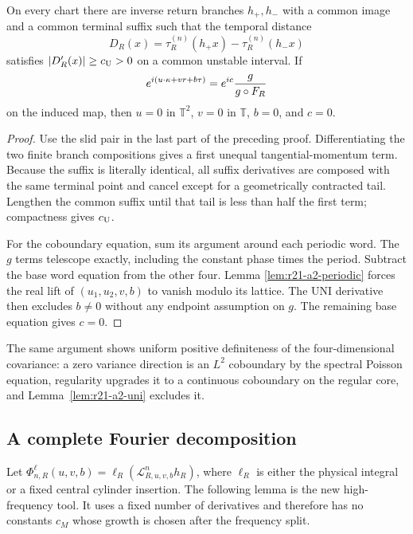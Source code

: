 \begin{lemma}
\label{lem:r21-a2-uni}
On every chart there are inverse return branches $h_+,h_-$ with a common
image and a common terminal suffix such that the temporal distance
\[
 D_R(x)=\tau_R^{(n)}(h_+x)-\tau_R^{(n)}(h_-x)
\]
satisfies $|D_R'(x)|\ge c_{\rm U}>0$ on a common unstable interval.  If
\[
 e^{i(u\cdot\kappa+vr+b\tau)}
 =e^{ic}{g\over g\circ F_R}
\]
on the induced map, then $u=0$ in $\mathbb T^2$, $v=0$ in $\mathbb T$,
$b=0$, and $c=0$.
\end{lemma}

\begin{proof}
Use the slid pair in the last part of the preceding proof.  Differentiating
the two finite branch compositions gives a first unequal tangential-momentum
term.  Because the suffix is literally identical, all suffix derivatives are
composed with the same terminal point and cancel except for a geometrically
contracted tail.  Lengthen the common suffix until that tail is less than half
the first term; compactness gives $c_{\rm U}$.

For the coboundary equation, sum its argument around each periodic word.  The
$g$ terms telescope exactly, including the constant phase times the period.
Subtract the base word equation from the other four.  Lemma
\ref{lem:r21-a2-periodic} forces the real lift of $(u_1,u_2,v,b)$ to vanish
modulo its lattice.  The UNI derivative then excludes $b\ne0$ without any
endpoint assumption on $g$.  The remaining base equation gives $c=0$.
\end{proof}

The same argument shows uniform positive definiteness of the four-dimensional
covariance: a zero variance direction is an $L^2$ coboundary by the spectral
Poisson equation, regularity upgrades it to a continuous coboundary on the
regular core, and Lemma~\ref{lem:r21-a2-uni} excludes it.

\subsection{A complete Fourier decomposition}

Let $\Phi_{n,R}^{\ell}(u,v,b)=
\ell_R(\mathcal L_{R,u,v,b}^nh_R)$, where $\ell_R$ is either the physical
integral or a fixed central cylinder insertion.  The following lemma is the
new high-frequency tool.  It uses a fixed number of derivatives and therefore
has no constants $c_M$ whose growth is chosen after the frequency split.

